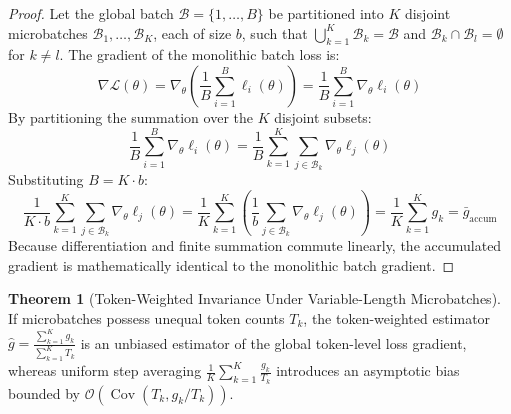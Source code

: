 \documentclass[11pt,a4paper]{article}
\theoremstyle{definition}
\newtheorem{theorem}{\textbf{Theorem}}[section]
\begin{document}
\begin{proof}
Let the global batch $\mathcal{B} = \{1, \dots, B\}$ be partitioned into $K$ disjoint microbatches $\mathcal{B}_1, \dots, \mathcal{B}_K$, each of size $b$, such that $\bigcup_{k=1}^K \mathcal{B}_k = \mathcal{B}$ and $\mathcal{B}_k \cap \mathcal{B}_l = \emptyset$ for $k \neq l$.
The gradient of the monolithic batch loss is:
{\boldmath
\begin{equation}
\nabla \mathcal{L}(\theta) = \nabla_\theta \left( \frac{1}{B} \sum_{i=1}^B \ell_i(\theta) \right) = \frac{1}{B} \sum_{i=1}^B \nabla_\theta \ell_i(\theta)
\end{equation}
}
By partitioning the summation over the $K$ disjoint subsets:
{\boldmath
\begin{equation}
\frac{1}{B} \sum_{i=1}^B \nabla_\theta \ell_i(\theta) = \frac{1}{B} \sum_{k=1}^K \sum_{j \in \mathcal{B}_k} \nabla_\theta \ell_j(\theta)
\end{equation}
}
Substituting $B = K \cdot b$:
{\boldmath
\begin{equation}
\frac{1}{K \cdot b} \sum_{k=1}^K \sum_{j \in \mathcal{B}_k} \nabla_\theta \ell_j(\theta) = \frac{1}{K} \sum_{k=1}^K \left( \frac{1}{b} \sum_{j \in \mathcal{B}_k} \nabla_\theta \ell_j(\theta) \right) = \frac{1}{K} \sum_{k=1}^K g_k = \bar{g}_{\text{accum}}
\end{equation}
}
Because differentiation and finite summation commute linearly, the accumulated gradient is mathematically identical to the monolithic batch gradient.
\end{proof}

\begin{theorem}[Token-Weighted Invariance Under Variable-Length Microbatches]
If microbatches possess unequal token counts $T_k$, the token-weighted estimator $\hat{g} = \frac{\sum_{k=1}^K g_k}{\sum_{k=1}^K T_k}$ is an unbiased estimator of the global token-level loss gradient, whereas uniform step averaging $\frac{1}{K} \sum_{k=1}^K \frac{g_k}{T_k}$ introduces an asymptotic bias bounded by $\mathcal{O}(\operatorname{Cov}(T_k, g_k / T_k))$.
\end{theorem}
\end{document}
